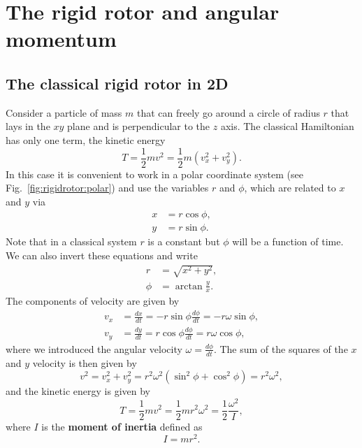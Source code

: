 \documentclass[../Main/chem331-notes.tex]{subfiles}
\begin{document}
\setcounter{section}{10}

\section{The rigid rotor and angular momentum}
\subsection{The classical rigid rotor in 2D}
Consider a particle of mass $m$ that can freely go around a circle of radius $r$ that lays in the $xy$ plane and is perpendicular to the $z$ axis.
The classical Hamiltonian has only one term, the kinetic energy
\begin{equation}
T = \frac{1}{2} m v^2 =  \frac{1}{2} m (v_x^2 + v_y^2).
\end{equation}
In this case it is convenient to work in a polar coordinate system (see Fig.~\ref{fig:rigidrotor:polar}) and use the variables $r$ and $\phi$, which are related to $x$ and $y$ via
\begin{align}
x & =  r \cos \phi, \\
y & =  r \sin \phi.
\end{align}
Note that in a classical system $r$ is a constant but $\phi$ will be a function of time.
We can also invert these equations and write
\begin{align}
r & =  \sqrt{x^2 + y^2}, \\
\phi & = \arctan\frac{y}{x}.
\end{align}
The components of velocity are given by
\begin{align}
v_x & = \frac{d x}{dt} = - r \sin \phi \frac{d\phi}{dt} = - r \omega \sin \phi , \\
v_y & = \frac{d y}{dt} =   r \cos \phi \frac{d\phi}{dt} =  r \omega \cos \phi,
\end{align}
where we introduced the angular velocity $\omega = \frac{d\phi}{dt}$.
The sum of the squares of the $x$ and $y$ velocity is then given by
\begin{equation}
v^2 = v_x^2 + v_y^2 = r^2 \omega^2 (\sin^2 \phi + \cos^2 \phi ) = r^2 \omega^2,
\end{equation}
and the kinetic energy is given by
\begin{equation}
T = \frac{1}{2} m v^2 =  \frac{1}{2} m r^2 \omega^2 = \frac{1}{2}\frac{\omega^2}{I},
\end{equation}
where $I$ is the \textbf{moment of inertia} defined as
\begin{equation}
I = m r^2.
\end{equation}
\end{document}
